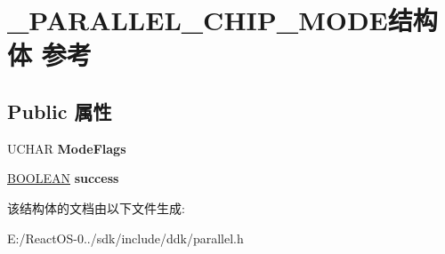 \hypertarget{struct___p_a_r_a_l_l_e_l___c_h_i_p___m_o_d_e}{}\section{\+\_\+\+P\+A\+R\+A\+L\+L\+E\+L\+\_\+\+C\+H\+I\+P\+\_\+\+M\+O\+D\+E结构体 参考}
\label{struct___p_a_r_a_l_l_e_l___c_h_i_p___m_o_d_e}
\subsection*{Public 属性}
\begin{DoxyCompactItemize}
\item 
\mbox{\label{struct___p_a_r_a_l_l_e_l___c_h_i_p___m_o_d_e_a48b33fd5924d87c01eedefceca1d82b4}} 
U\+C\+H\+AR {\bfseries Mode\+Flags}
\item 
\mbox{\label{struct___p_a_r_a_l_l_e_l___c_h_i_p___m_o_d_e_a1ec584112d887ba4813d0076a594676f}} 
\hyperlink{_processor_bind_8h_a112e3146cb38b6ee95e64d85842e380a}{B\+O\+O\+L\+E\+AN} {\bfseries success}
\end{DoxyCompactItemize}


该结构体的文档由以下文件生成\+:\begin{DoxyCompactItemize}
\item 
E\+:/\+React\+O\+S-\/0../sdk/include/ddk/parallel.\+h\end{DoxyCompactItemize}
